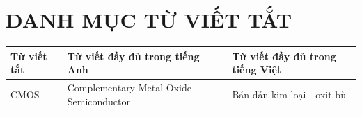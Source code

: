 \section*{DANH MỤC TỪ VIẾT TẮT}
{}

\begin{center}
\renewcommand{\arraystretch}{1.5} %
\begin{tabular}{|p{2.5cm}|p{6cm}|p{6cm}|}
\hline
\textbf{Từ viết tắt} & \textbf{Từ viết đầy đủ trong tiếng Anh} & \textbf{Từ viết đầy đủ trong tiếng Việt} \\
\hline
CMOS & Complementary Metal-Oxide-Semiconductor & Bán dẫn kim loại - oxit bù \\
\hline
\end{tabular}
\end{center} %


\newpage